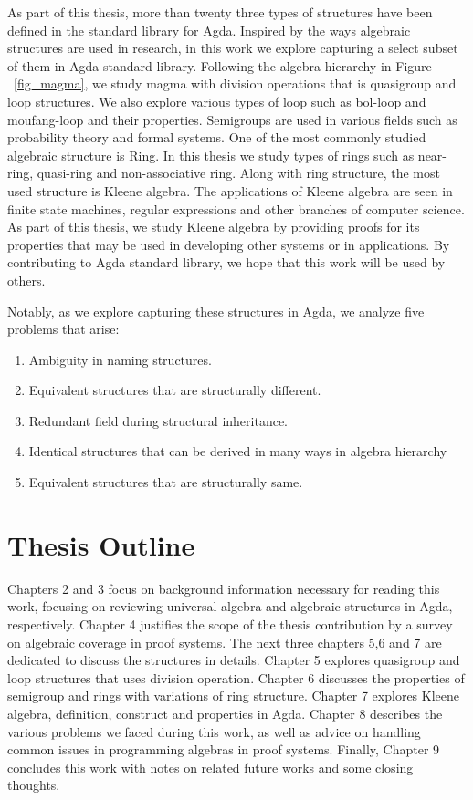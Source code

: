 As part of this thesis, more than twenty three types of structures have been
defined in the standard library for Agda. Inspired by the ways algebraic
structures are used in research, in this work we explore capturing a select
subset of them in Agda standard library. Following the algebra hierarchy in
Figure ~\ref{fig_magma}, we study magma with division operations that is
quasigroup and loop structures. We also explore various types of loop such as
bol-loop and moufang-loop and their properties. Semigroups are used in various
fields such as probability theory and formal systems. One of the most commonly
studied algebraic structure is Ring. In this thesis we study types of rings such
as near-ring, quasi-ring and non-associative ring. Along with ring structure,
the most used structure is Kleene algebra. The applications of Kleene algebra
are seen in finite state machines, regular expressions and other branches of
computer science. As part of this thesis, we study Kleene algebra by providing
proofs for its properties that may be used in developing other systems or in
applications. By contributing to Agda standard library, we hope that this work
will be used by others. 

Notably, as we explore capturing these structures in Agda, we analyze five problems that arise:
\begin{enumerate}
\item Ambiguity in naming structures.
\item Equivalent structures that are structurally different.
\item Redundant field during structural inheritance.
\item Identical structures that can be derived in many ways in algebra hierarchy
\item Equivalent structures that are structurally same.
\end{enumerate}

\section{Thesis Outline}
Chapters 2 and 3 focus on background information necessary for reading this
work, focusing on reviewing universal algebra and algebraic structures in Agda,
respectively. Chapter 4 justifies the scope of the thesis contribution by a
survey on algebraic coverage in proof systems. The next three chapters 5,6 and 7
are dedicated to discuss the structures in details. Chapter 5 explores
quasigroup and loop structures that uses division operation. Chapter 6 discusses
the properties of semigroup and rings with variations of ring structure. Chapter
7 explores Kleene algebra, definition, construct and properties in Agda. Chapter
8 describes the various problems we faced during this work, as well as advice on
handling common issues in programming algebras in proof systems. Finally,
Chapter 9 concludes this work with notes on related future works and some
closing thoughts.
